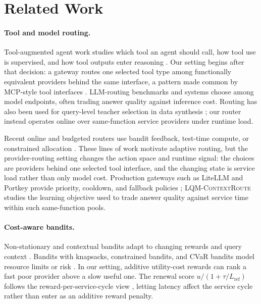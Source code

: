 \documentclass[11pt]{article}
\newcommand{\lqmcr}{\textsc{LQM-ContextRoute}}
\begin{document}
\section{Related Work}
\label{sec:related}

\paragraph{Tool and model routing.} Tool-augmented agent work studies which tool an agent should call, how tool use is supervised, and how tool outputs enter reasoning \citep{schick2023toolformer,patil2023gorilla,qin2023toolllm,yao2022react,xu2025learning,jiang2026scribe}. Our setting begins after that decision: a gateway routes one selected tool type among functionally equivalent providers behind the same interface, a pattern made common by MCP-style tool interfaces \citep{mcp_spec}. LLM-routing benchmarks and systems \citep{routerbench2024,llmrouterbench2026,ong2024routellm,uniroute2025} choose among model endpoints, often trading answer quality against inference cost. Routing has also been used for query-level teacher selection in data synthesis \citep{zhang2025find}; our router instead operates online over same-function service providers under runtime load.

Recent online and budgeted routers use bandit feedback, test-time compute, or constrained allocation \citep{zhang2024mar,pilot2025,barp2025,onlinemultillm2025,bestroute2025,omnirouter2025,paretobandit2026}. These lines of work motivate adaptive routing, but the provider-routing setting changes the action space and runtime signal: the choices are providers behind one selected tool interface, and the changing state is service load rather than only model cost. Production gateways such as LiteLLM and Portkey provide priority, cooldown, and fallback policies \citep{litellm2026routing,portkey2026gateway,portkey2026fallback}; \lqmcr{} studies the learning objective used to trade answer quality against service time within such same-function pools.

\paragraph{Cost-aware bandits.} Non-stationary and contextual bandits adapt to changing rewards and query context \citep{garivier2011upper,kocsis2006discounted,russac2019weighted,li2010contextual}. Bandits with knapsacks, constrained bandits, and CVaR bandits model resource limits or risk \citep{badanidiyuru2018bwk,agrawal2019bwk,combes2015bwk,lim2022risk}. In our setting, additive utility-cost rewards can rank a fast poor provider above a slow useful one. The renewal score $u/(1{+}\tau/L_{\text{ref}})$ follows the reward-per-service-cycle view \citep{ross1996stochastic}, letting latency affect the service cycle rather than enter as an additive reward penalty.
\end{document}
